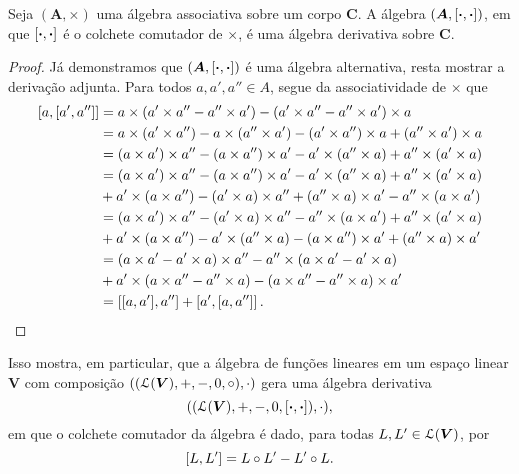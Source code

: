 \begin{proposition}
Seja $(\bm A,\times)$ uma álgebra associativa sobre um corpo $\bm C$. A álgebra $(\bm A,\left[{\bm{\cdot}},{\bm{\cdot}}\right])$, em que $\left[{\bm{\cdot}},{\bm{\cdot}}\right]$ é o colchete comutador de $\times$, é uma álgebra derivativa sobre $\bm C$.
\end{proposition}
\begin{proof}
Já demonstramos que $(\bm A,\left[{\bm{\cdot}},{\bm{\cdot}}\right])$ é uma álgebra alternativa, resta mostrar a derivação adjunta. Para todos $a,a',a'' \in A$, segue da associatividade de $\times$ que
	\begin{align*}
	\left[{a},{\left[{a'},{a''}\right]}\right] &= a \times (a' \times a'' - a'' \times a') - (a' \times a'' - a'' \times a') \times a \\
		&= a \times (a' \times a'') - a \times (a'' \times a') - (a' \times a'') \times a + (a'' \times a') \times a \\
		&= (a \times a') \times a'' - (a \times a'') \times a' - a' \times (a'' \times a) + a'' \times (a' \times a) \\
		&= (a \times a') \times a'' - (a \times a'') \times a' - a' \times (a'' \times a) + a'' \times (a' \times a) \\
		&+ a' \times (a \times a'') - (a' \times a) \times a'' + (a'' \times a) \times a' - a'' \times (a \times a') \\
		&= (a \times a') \times a'' - (a' \times a) \times a'' - a'' \times (a \times a') + a'' \times (a' \times a) \\
		&+ a' \times (a \times a'') - a' \times (a'' \times a) - (a \times a'') \times a' + (a'' \times a) \times a' \\
		&= (a \times a' - a' \times a) \times a'' - a'' \times (a \times a' - a' \times a) \\
		&+ a' \times (a \times a'' - a'' \times a) - (a \times a'' - a'' \times a) \times a' \\
		&= \left[{\left[{a},{a'}\right]},{a''}\right] + \left[{a'},{\left[{a},{a''}\right]}\right].
		\qedhere
	\end{align*}
\end{proof}

Isso mostra, em particular, que a álgebra de funções lineares em um espaço linear $\bm V$ com composição $((\mathcal{L}(\bm V),+,-,0,\circ),\cdot)$ gera uma álgebra derivativa
	\begin{equation*}
	((\mathcal{L}(\bm V),+,-,0,\left[{\bm{\cdot}},{\bm{\cdot}}\right]),\cdot),                                                                                                                                                                                                                  \end{equation*}
em que o colchete comutador da álgebra é dado, para todas $L,L' \in \mathcal{L}(\bm V)$, por
	\begin{equation*}
	\left[{L},{L'}\right] = L \circ L' - L' \circ L.
	\end{equation*}

